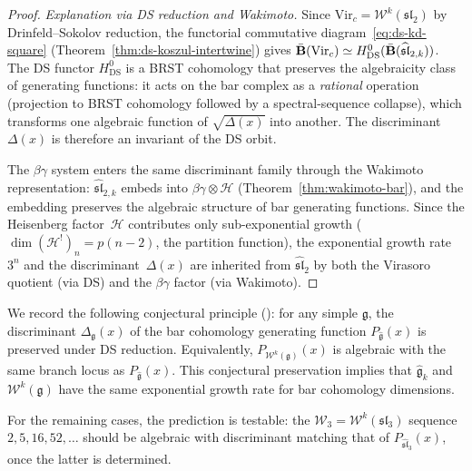 \begin{proof}
\emph{Explanation via DS reduction and Wakimoto.}
Since $\mathrm{Vir}_c = \mathcal{W}^k(\mathfrak{sl}_2)$ by
Drinfeld--Sokolov reduction, the functorial commutative
diagram~\eqref{eq:ds-kd-square}
(Theorem~\ref{thm:ds-koszul-intertwine}) gives
$\bar{\mathbf{B}}(\mathrm{Vir}_c) \simeq
H^0_{\mathrm{DS}}(\bar{\mathbf{B}}(\widehat{\mathfrak{sl}}_{2,k}))$.
The DS functor $H^0_{\mathrm{DS}}$ is a BRST cohomology that preserves
the algebraicity class of generating functions:
it acts on the bar complex as a \emph{rational} operation
(projection to BRST cohomology followed by a spectral-sequence
collapse), which transforms one algebraic function of
$\sqrt{\Delta(x)}$ into another.  The discriminant $\Delta(x)$
is therefore an invariant of the DS orbit.

The $\beta\gamma$ system enters the same discriminant family
through the Wakimoto representation:
$\widehat{\mathfrak{sl}}_{2,k}$ embeds into
$\beta\gamma \otimes \mathcal{H}$ (Theorem~\ref{thm:wakimoto-bar}),
and the embedding preserves the algebraic structure of bar
generating functions.  Since the Heisenberg factor~$\mathcal{H}$
contributes only sub-exponential growth
($\dim (\mathcal{H}^!)_n = p(n{-}2)$, the partition function),
the exponential growth rate~$3^n$ and the discriminant~$\Delta(x)$
are inherited from $\widehat{\mathfrak{sl}}_2$ by both the
Virasoro quotient (via DS) and the $\beta\gamma$ factor (via Wakimoto).
\end{proof}

\begin{remark}\label{rem:ds-discriminant-invariant}
We record the following conjectural principle
(\ClaimStatusConjectured): for any simple $\mathfrak{g}$, the
discriminant $\Delta_{\mathfrak{g}}(x)$ of the bar cohomology
generating function $P_{\widehat{\mathfrak{g}}}(x)$ is preserved under
DS reduction.  Equivalently, $P_{\mathcal{W}^k(\mathfrak{g})}(x)$ is
algebraic with the same branch locus as
$P_{\widehat{\mathfrak{g}}}(x)$.  This conjectural preservation implies
that $\widehat{\mathfrak{g}}_k$ and $\mathcal{W}^k(\mathfrak{g})$
have the same exponential
growth rate for bar cohomology dimensions.

For the remaining cases, the prediction is testable:
the $\mathcal{W}_3 = \mathcal{W}^k(\mathfrak{sl}_3)$ sequence
$2, 5, 16, 52, \ldots$ should be algebraic with discriminant
matching that of $P_{\widehat{\mathfrak{sl}}_3}(x)$, once the latter
is determined.
\end{remark}

